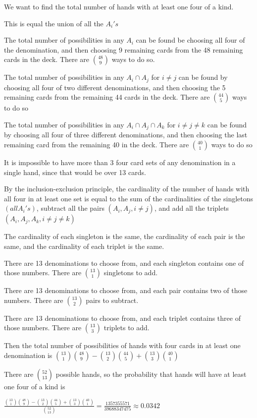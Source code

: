 \documentclass[11pt]{article}
\begin{document}
\begin{itemize}
  We want to find the total number of hands with at least one four of a kind.

  This is equal the union of all the $A_i's$

  The total number of possibilities in any $A_i$ can be found be choosing all four of the denomination, and then choosing 9 remaining cards from the 48 remaining cards in the deck. There are $\binom{48}{9}$ ways to do so.

  The total number of possibilities in any $A_i \cap A_j$ for $i \neq j$ can be found by choosing all four of two different denominations, and then choosing the 5 remaining cards from the remaining 44 cards in the deck. There are $\binom{44}{5}$ ways to do so

  The total number of possibilities in any $A_i \cap A_j \cap A_k$ for $i \neq j \neq k$ can be found by choosing all four of three different denominations, and then choosing the last remaining card from the remaining 40 in the deck. There are $\binom{40}{1}$ ways to do so

  It is impossible to have more than 3 four card sets of any denomination in a single hand, since that would be over 13 cards.

  By the inclusion-exclusion principle, the cardinality of the number of hands with all four in at least one set is equal to the sum of the cardinalities of the singletons $(all A_i's)$, subtract all the pairs $(A_i, A_j, i\neq j)$, and add all the triplets $(A_i, A_j, A_k, i\neq j \neq k)$

  The cardinality of each singleton is the same, the cardinality of each pair is the same, and the cardinality of each triplet is the same.

  There are 13 denominations to choose from, and each singleton contains one of those numbers. There are $\binom{13}{1}$ singletons to add.

  There are 13 denominations to choose from, and each pair contains two of those numbers. There are $\binom{13}{2}$ pairs to subtract.

  There are 13 denominations to choose from, and each triplet contains three of those numbers. There are $\binom{13}{3}$ triplets to add.

  Then the total number of possibilities of hands with four cards in at least one denomination is $\binom{13}{1}\binom{48}{9} - \binom{13}{2}\binom{44}{5} + \binom{13}{3}\binom{40}{1}$

  There are $\binom{52}{13}$ possible hands, so the probability that hands will have at least one four of a kind is

  $\frac{\binom{13}{1}\binom{48}{9} - \binom{13}{2}\binom{44}{5} + \binom{13}{3}\binom{40}{1}}{\binom{52}{13}} = \frac{1357355571}{39688347475} \approx 0.0342$
\end{itemize}
\end{document}
